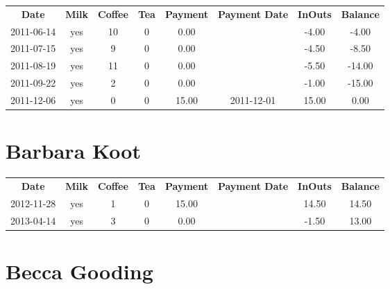 \begin{center}
\begin{tabular}{cccccccc}
\textbf{Date} & \textbf{Milk} & \textbf{Coffee} & \textbf{Tea} & \textbf{Payment} & \textbf{Payment Date} & \textbf{InOuts} & \textbf{Balance} \\
2011-06-14 & yes & 10 & 0 &  0.00 &  & -4.00 &  -4.00\\ 
2011-07-15 & yes &  9 & 0 &  0.00 &  & -4.50 &  -8.50\\ 
2011-08-19 & yes & 11 & 0 &  0.00 &  & -5.50 & -14.00\\ 
2011-09-22 & yes &  2 & 0 &  0.00 &  & -1.00 & -15.00\\ 
2011-12-06 & yes &  0 & 0 & 15.00 & 2011-12-01 & 15.00 &   0.00
\end{tabular}
\end{center}

\section{Barbara Koot}

\begin{center}
\begin{tabular}{cccccccc}
\textbf{Date} & \textbf{Milk} & \textbf{Coffee} & \textbf{Tea} & \textbf{Payment} & \textbf{Payment Date} & \textbf{InOuts} & \textbf{Balance} \\
2012-11-28 & yes & 1 & 0 & 15.00 &  & 14.50 & 14.50\\ 
2013-04-14 & yes & 3 & 0 &  0.00 &  & -1.50 & 13.00
\end{tabular}
\end{center}

\section{Becca Gooding}

